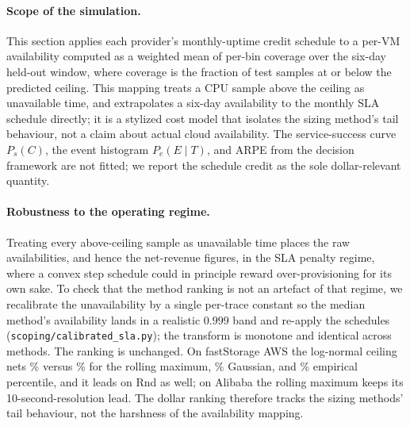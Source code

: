 \documentclass[11pt,a4paper]{article}
\newcommand{\Ps}{P_{\!s}}
\newcommand{\Pe}{P_{\!e}}
\begin{document}
\paragraph{Scope of the simulation.} This section applies each provider's
monthly-uptime credit schedule to a per-VM availability computed as a
weighted mean of per-bin coverage over the six-day held-out window, where
coverage is the fraction of test samples at or below the predicted
ceiling. This mapping treats a CPU sample above the ceiling as unavailable
time, and extrapolates a six-day availability to the monthly SLA schedule
directly; it is a stylized cost model that isolates the sizing method's
tail behaviour, not a claim about actual cloud availability. The
service-success curve $\Ps(C)$, the event histogram $\Pe(E \mid T)$, and
ARPE from the decision framework are not fitted; we report the schedule
credit as the sole dollar-relevant quantity.

\paragraph{Robustness to the operating regime.} Treating every
above-ceiling sample as unavailable time places the raw availabilities,
and hence the net-revenue figures, in the SLA penalty regime, where a
convex step schedule could in principle reward over-provisioning for its
own sake. To check that the method ranking is not an artefact of that
regime, we recalibrate the unavailability by a single per-trace constant
so the median method's availability lands in a realistic $0.999$ band and
re-apply the schedules (\texttt{scoping/calibrated\_sla.py}); the
transform is monotone and identical across methods. The ranking is
unchanged. On fastStorage AWS the log-normal ceiling nets \CalSlaLn{}\%
versus \CalSlaRm{}\% for the rolling maximum, \CalSlaGa{}\% Gaussian, and
\CalSlaEp{}\% empirical percentile, and it leads on Rnd as well; on
Alibaba the rolling maximum keeps its 10-second-resolution lead. The
dollar ranking therefore tracks the sizing methods' tail behaviour, not
the harshness of the availability mapping.
\end{document}

